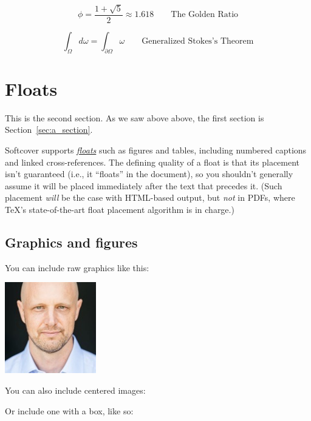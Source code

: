 \begin{equation}
\label{eq:golden_ratio}
\phi = \frac{1+\sqrt{5}}{2} \approx 1.618 \qquad{\text{The Golden Ratio}}
\end{equation}

\begin{equation}
\label{eq:stokes_theorem}
\int_\Omega d\omega = \int_{\partial\Omega} \omega \qquad{\text{Generalized Stokes's Theorem}}
\end{equation}

\section{Floats}
\label{sec:floats}

This is the second section. As we saw above above, the first section is Section~\ref{sec:a_section}.

Softcover supports \href{http://en.wikibooks.org/wiki/LaTeX/Floats,_Figures_and_Captions}{\emph{floats}} such as figures and tables, including numbered captions and linked cross-references. The defining quality of a float is that its placement isn't guaranteed (i.e., it ``floats'' in the document), so you shouldn't generally assume it will be placed immediately after the text that precedes it. (Such placement \emph{will} be the case with HTML-based output, but \emph{not} in PDFs, where \TeX's state-of-the-art float placement algorithm is in charge.)

\subsection{Graphics and figures}
\label{sec:graphics_and_figures}

You can include raw graphics like this:

\includegraphics{images/01_michael_hartl_headshot.jpg}

\noindent You can also include centered images:


\noindent Or include one with a box, like so:

